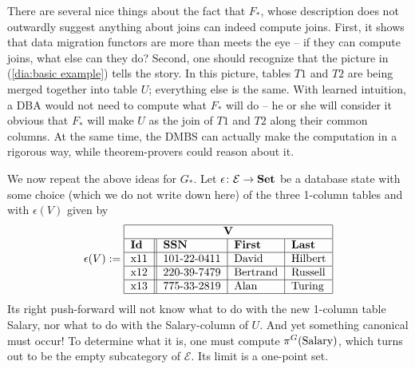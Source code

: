 \documentclass{amsart}
\def\tn{\textnormal}
\def\mc{\mathcal}
\def\to{\rightarrow}
\def\taking{\colon}
\def\Set{{\bf Set}}
\def\mcE{\mc{E}}
\theoremstyle{remark}
\theoremstyle{definition}
\begin{document}
There are several nice things about the fact that $F_*$, whose description does not outwardly suggest anything about joins can indeed compute joins.  First, it shows that data migration functors are more than meets the eye -- if they can compute joins, what else can they do?  Second, one should recognize that the picture in (\ref{dia:basic example}) tells the story.  In this picture, tables $T1$ and $T2$ are being merged together into table $U$; everything else is the same.  With learned intuition, a DBA would not need to compute what $F_*$ will do -- he or she will consider it obvious that $F_*$ will make $U$ as the join of $T1$ and $T2$ along their common columns.  At the same time, the DMBS can actually make the computation in a rigorous way, while theorem-provers could reason about it.  

We now repeat the above ideas for $G_*$.  Let $\epsilon\taking\mcE\to\Set$ be a database state with some choice (which we do not write down here) of the three 1-column tables and with $\epsilon(V)$ given by \begin{align*}\epsilon(V):=\begin{tabular}{| l || l | l | l |}\hline\multicolumn{4}{| c |}{\bf V}\\\hline{\bf Id}&{\bf SSN}&{\bf First}&{\bf Last}\\\hline x11&101-22-0411&David&Hilbert\\\hline x12&220-39-7479&Bertrand&Russell\\\hline x13&775-33-2819&Alan&Turing\\\hline\end{tabular}\end{align*}  Its right push-forward will not know what to do with the new 1-column table Salary, nor what to do with the Salary-column of $U$.  And yet something canonical must occur!  To determine what it is, one must compute $\pi^G(\tn{Salary})$, which turns out to be the empty subcategory of $\mcE$.   Its limit is a one-point set.
\end{document}
